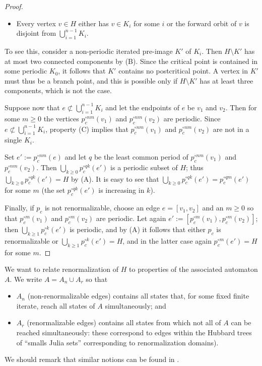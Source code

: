 \documentclass[12pt]{amsart}
\newcommand{\sm}{\setminus}
\newcommand{\0}{\texttt{0}}
\newcommand{\1}{\texttt{1}}
\theoremstyle{definition}
\numberwithin{equation}{section}
\begin{document}
\begin{proof}
\begin{itemize}
\item[(C)] 
Every vertex $v\in H$ either has $v\in K_i$ for some $i$ or the forward orbit of $v$ is disjoint from $\bigcup _{i=1}^{n-1}K_i$. 
\end{itemize} 
To see this, consider a non-periodic iterated pre-image $K'$ of $K_i$. Then $H\setminus K'$ has at most two connected components by (B). Since the critical point is contained in some periodic $K_0$, it follows that $K'$ contains no postcritical point. A vertex in $K'$ must thus be a branch point, and this is possible only if $H\sm K'$ has at least three components, which is not the case.  


Suppose now that $e\not \subset \bigcup_{i=1}^{n-1}K_i$ and let the endpoints of $e$ be $v_1$ and $v_2$. Then for some $m\ge 0$ the vertices $p_c^{\circ nm}(v_1)$ and $p_c^{\circ nm}(v_2)$ are periodic. Since  $e\not \subset \bigcup_{i=1}^{n-1}K_i$, property (C) implies that $p_c^{\circ nm}(v_1)$ and $p_c^{\circ nm}(v_2)$ are not in a single $K_i$. 

Set $e':=p_c^{\circ nm}(e) $ and let $q$ be the least common  period of $p_c^{\circ nm}(v_1)$ and $p_c^{\circ nm}(v_2)$. Then $\bigcup_{k\ge 0}p_c^{\circ qk} (e')$ is a periodic subset of $H$; thus $\bigcup_{k\ge 0}p_c^{\circ qk} (e')=H$ by (A). It is easy to see that $\bigcup_{k\ge 0}p_c^{\circ qk}(e') = p_c^{\circ qm}(e') $ for some $m$ (the set $p_c^{\circ qk}(e')$ is increasing in $k$). 

Finally, if $p_c$ is not renormalizable, choose an edge $e=[v_1,v_2]$ and an $m\ge 0$ so that $p_c^{\circ m}(v_1)$ and $p_c^{\circ m}(v_2)$ are periodic. Let again $e':=[p_c^{\circ m}(v_1),p_c^{\circ m}(v_2)]$; then $\bigcup_{k\ge 1}p_c^{\circ k} (e')$ is periodic, and by (A) it follows that either $p_c$ is renormalizable or $\bigcup_{k\ge 1}p_c^{\circ k} (e')=H$, and in the latter case again $p_c^{\circ m} (e')=H$ for some $m$. 
\end{proof}



We want to relate renormalization of $H$ to properties of the associated automaton $A$. We write 
$A=A_n\cup A_r$ so that 
\begin{itemize}
\item $A_n$ (non-renormalizable edges) contains all states that, for some fixed finite iterate, reach all states of  $A$ simultaneously; and 
\item $A_r$ (renormalizable edges) contains all states from which {not all} of $A$ can be reached simultaneously: these correspond to edges within the Hubbard trees of  ``smalls Julia sets'' corresponding to renormalization domains).
\end{itemize}
We should remark that similar notions can be found in \cite[Sec~3.3]{Jung}.
\end{document}
